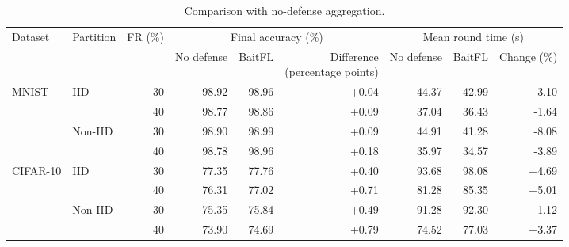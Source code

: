 \begin{table}[t]\centering\footnotesize\setlength{\tabcolsep}{5pt}
\caption{Comparison with no-defense aggregation.}\label{tab:baseline}
\begin{tabular}{llrrrrrrr}\toprule
\multirow{2}{*}{Dataset} & \multirow{2}{*}{Partition} & \multirow{2}{*}{FR (\%)} & \multicolumn{3}{c}{Final accuracy (\%)} & \multicolumn{3}{c}{Mean round time (s)} \\
\cmidrule(lr){4-6}\cmidrule(lr){7-9}
& & & No defense & BaitFL & \shortstack{Difference\\(percentage points)} & No defense & BaitFL & Change (\%) \\ \midrule
\multirow{4}{*}{MNIST} & \multirow{2}{*}{IID} & 30 & 98.92 & 98.96 & +0.04 & 44.37 & 42.99 & -3.10 \\
 &  & 40 & 98.77 & 98.86 & +0.09 & 37.04 & 36.43 & -1.64 \\
\cmidrule(lr){2-9}
 & \multirow{2}{*}{Non-IID} & 30 & 98.90 & 98.99 & +0.09 & 44.91 & 41.28 & -8.08 \\
 &  & 40 & 98.78 & 98.96 & +0.18 & 35.97 & 34.57 & -3.89 \\
\midrule
\multirow{4}{*}{CIFAR-10} & \multirow{2}{*}{IID} & 30 & 77.35 & 77.76 & +0.40 & 93.68 & 98.08 & +4.69 \\
 &  & 40 & 76.31 & 77.02 & +0.71 & 81.28 & 85.35 & +5.01 \\
\cmidrule(lr){2-9}
 & \multirow{2}{*}{Non-IID} & 30 & 75.35 & 75.84 & +0.49 & 91.28 & 92.30 & +1.12 \\
 &  & 40 & 73.90 & 74.69 & +0.79 & 74.52 & 77.03 & +3.37 \\
\bottomrule\end{tabular}\end{table}
